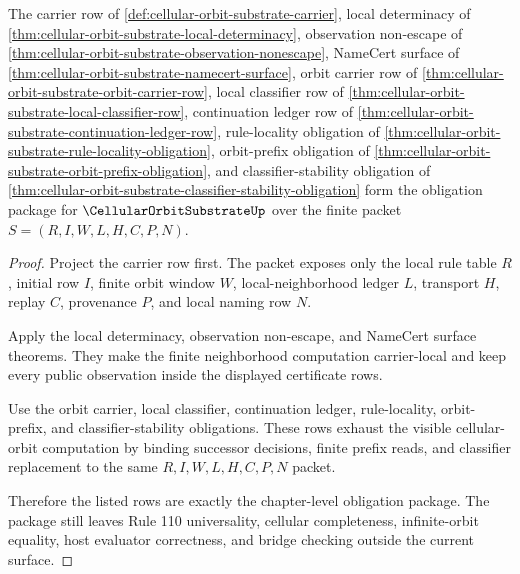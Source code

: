 \begin{theorem}
\label{thm:cellular-orbit-substrate-obligation-closure-package}
The carrier row of \autoref{def:cellular-orbit-substrate-carrier}, local determinacy of \autoref{thm:cellular-orbit-substrate-local-determinacy}, observation non-escape of \autoref{thm:cellular-orbit-substrate-observation-nonescape}, NameCert surface of \autoref{thm:cellular-orbit-substrate-namecert-surface}, orbit carrier row of \autoref{thm:cellular-orbit-substrate-orbit-carrier-row}, local classifier row of \autoref{thm:cellular-orbit-substrate-local-classifier-row}, continuation ledger row of \autoref{thm:cellular-orbit-substrate-continuation-ledger-row}, rule-locality obligation of \autoref{thm:cellular-orbit-substrate-rule-locality-obligation}, orbit-prefix obligation of \autoref{thm:cellular-orbit-substrate-orbit-prefix-obligation}, and classifier-stability obligation of \autoref{thm:cellular-orbit-substrate-classifier-stability-obligation} form the obligation package for $\CellularOrbitSubstrateUp$ over the finite packet $S=(R,I,W,L,H,C,P,N)$.
\end{theorem}
\begin{proof}
Project the carrier row first. The packet exposes only the local rule table $R$, initial row $I$, finite orbit window $W$, local-neighborhood ledger $L$, transport $H$, replay $C$, provenance $P$, and local naming row $N$.

Apply the local determinacy, observation non-escape, and NameCert surface theorems. They make the finite neighborhood computation carrier-local and keep every public observation inside the displayed certificate rows.

Use the orbit carrier, local classifier, continuation ledger, rule-locality, orbit-prefix, and classifier-stability obligations. These rows exhaust the visible cellular-orbit computation by binding successor decisions, finite prefix reads, and classifier replacement to the same $R,I,W,L,H,C,P,N$ packet.

Therefore the listed rows are exactly the chapter-level obligation package. The package still leaves Rule 110 universality, cellular completeness, infinite-orbit equality, host evaluator correctness, and bridge checking outside the current surface.
\end{proof}

